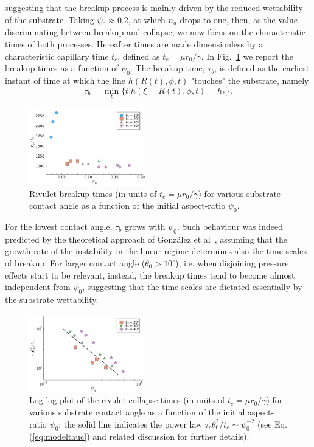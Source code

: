 \documentclass[twoside,twocolumn,9pt]{article}
\begin{document}
suggesting that the breakup process is mainly driven by the reduced wettability of the substrate.
Taking $\psi_0 \approx 0.2$, at which $n_d$ drops to one, then, as the 
value discriminating between breakup and collapse, we now focus on the 
characteristic times of both processes.
Hereafter times are made dimensionless by a characteristic capillary time $t_c$, defined as 
$t_c = \mu r_0/\gamma$.
In Fig.~\ref{fig:breakuptimes} we report the breakup times as a function of $\psi_0$.
The breakup time, $\tau_b$, is defined as the earliest instant of time at
which the line $h(R(t),\phi,t)$ "touches" the substrate, namely
\begin{equation}\label{eq:breakuptime}
\tau_b = \min_t \{t | h(\xi=R(t),\phi,t) = h_{\ast}\}.
\end{equation}
\begin{figure}
    \centering
    \includegraphics[width = 0.45\textwidth]{assets/breakup_tc.pdf}
    \caption{Rivulet breakup times (in units of $t_c = \mu r_0/\gamma$) for various substrate contact angle 
    as a function of the initial aspect-ratio $\psi_0$.}
    \label{fig:breakuptimes}
\end{figure}
For the lowest contact angle, $\tau_b$ grows with $\psi_0$. Such behaviour
was indeed predicted by the theoretical approach of Gonz\'alez et al~\cite{gonzalezStabilityLiquidRing2013}, assuming that the growth rate of the instability in the linear regime determines also the time scales of breakup. For larger contact angle ($\theta_0 > 10^{\circ}$), i.e. when disjoining pressure effects start to be relevant, instead, the breakup times tend to become almost independent from $\psi_0$, suggesting that the time scales are dictated essentially by the substrate wettability.\\
\begin{figure}
    \centering
    \includegraphics[width = 0.45\textwidth]{assets/psi_0_collapse.pdf}
    \caption{Log-log plot of the rivulet collapse times (in units of $t_c = \mu r_0/\gamma$) for various substrate contact angle 
    as a function of the initial aspect-ratio $\psi_0$; the solid line indicates the power law $\tau_c \theta_0^2/t_c \sim \psi_0^{-2}$ (see Eq.(\ref{eq:modeltauc}) and related discussion for further details).}
    \label{fig:collapsetimes}
\end{figure}
\end{document}
